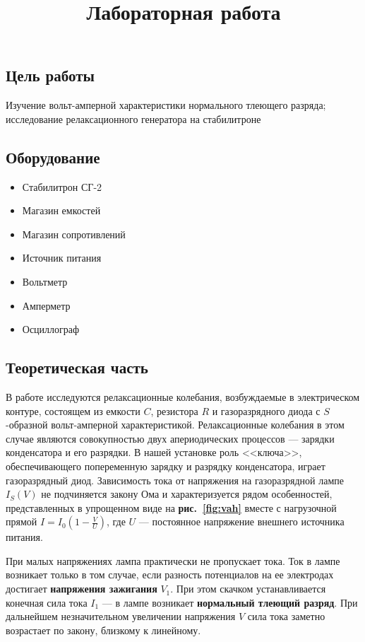 \documentclass[a4paper, 12pt]{article}
\title{
  Лабораторная работа \textnumero \\
  \textbf{\textquote{\unskip}}
}
\author{}
\date{}
\begin{document}
\maketitle\thispagestyle{fancy}

\subsection*{Цель работы}
Изучение вольт-амперной характеристики нормального тлеющего разряда; исследование
релаксационного генератора на стабилитроне

\subsection*{Оборудование}
\begin{itemize}[noitemsep]
  \item Стабилитрон СГ-2
  \item Магазин емкостей
  \item Магазин сопротивлений
  \item Источник питания
  \item Вольтметр
  \item Амперметр
  \item Осциллограф
\end{itemize}

\subsection*{Теоретическая часть}
В работе исследуются релаксационные колебания, возбуждаемые в электрическом
контуре, состоящем из емкости $C$, резистора $R$ и газоразрядного диода с
$S$-образной вольт-амперной характеристикой. Релаксационные колебания в этом
случае являются совокупностью двух апериодических процессов --- зарядки
конденсатора и его разрядки. В нашей установке роль <<ключа>>, обеспечивающего
попеременную зарядку и разрядку конденсатора, играет газоразрядный
диод. Зависимость тока от напряжения на газоразрядной лампе
$I_S \left( V \right)$ не подчиняется закону Ома и характеризуется рядом особенностей,
представленных в упрощенном виде на \textbf{рис.~\ref{fig:vah}} вместе с
нагрузочной прямой $I=I_0 \left( 1-\frac{ V }{ U} \right)$, где $U$ --- постоянное напряжение
внешнего источника питания.

При малых напряжениях лампа практически не пропускает тока. Ток в лампе
возникает только в том случае, если разность потенциалов на ее электродах
достигает \textbf{напряжения зажигания} $V_1$. При этом скачком устанавливается
конечная сила тока $I_1$ --- в лампе возникает \textbf{нормальный тлеющий
разряд}. При дальнейшем незначительном увеличении напряжения $V$ сила тока
заметно возрастает по закону, близкому к линейному.
\end{document}
